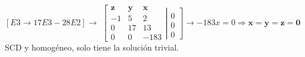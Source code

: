 \begin{proofw}
 \noindent \textcolor{gris}{$[E3 \to 17E3-28E2]\to $}
   $\left[ \begin{matrix}
  \boldsymbol{z} & \boldsymbol{y} & \boldsymbol{x} \\
   -1 & 5 & 2  \\ 0 & 17 & 13 \\ 0 & 0 & -183 
 \end{matrix}\right. 
 \left| \begin{matrix}
 \\ 0 \\ 0 \\ 0 
 \end{matrix}\right]  \to -183x=0 \Rightarrow \boldsymbol{x=y=z=0}\; $ \normalsize{SCD y homogéneo, solo tiene la solución trivial.}

\end{proofw}

